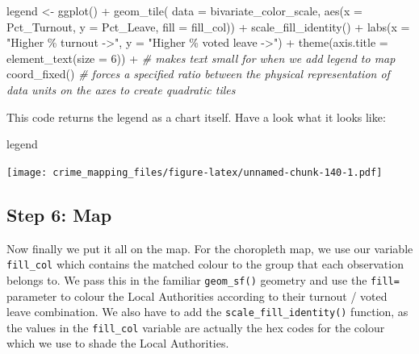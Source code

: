 \documentclass[
]{book}
\newenvironment{Shaded}{\begin{snugshade}}{\end{snugshade}}
\newcommand{\AttributeTok}[1]{\textcolor[rgb]{0.77,0.63,0.00}{#1}}
\newcommand{\CommentTok}[1]{\textcolor[rgb]{0.56,0.35,0.01}{\textit{#1}}}
\newcommand{\DecValTok}[1]{\textcolor[rgb]{0.00,0.00,0.81}{#1}}
\newcommand{\FunctionTok}[1]{\textcolor[rgb]{0.00,0.00,0.00}{#1}}
\newcommand{\NormalTok}[1]{#1}
\newcommand{\OtherTok}[1]{\textcolor[rgb]{0.56,0.35,0.01}{#1}}
\newcommand{\SpecialCharTok}[1]{\textcolor[rgb]{0.00,0.00,0.00}{#1}}
\newcommand{\StringTok}[1]{\textcolor[rgb]{0.31,0.60,0.02}{#1}}
\begin{document}
\begin{Shaded}
\begin{Highlighting}[]
\NormalTok{legend }\OtherTok{\textless{}{-}} \FunctionTok{ggplot}\NormalTok{() }\SpecialCharTok{+}
  \FunctionTok{geom\_tile}\NormalTok{( }\AttributeTok{data =}\NormalTok{ bivariate\_color\_scale, }\FunctionTok{aes}\NormalTok{(}\AttributeTok{x =}\NormalTok{ Pct\_Turnout, }\AttributeTok{y =}\NormalTok{ Pct\_Leave, }\AttributeTok{fill =}\NormalTok{ fill\_col)) }\SpecialCharTok{+}
  \FunctionTok{scale\_fill\_identity}\NormalTok{() }\SpecialCharTok{+}
  \FunctionTok{labs}\NormalTok{(}\AttributeTok{x =} \StringTok{"Higher \% turnout {-}\textgreater{}"}\NormalTok{,}
       \AttributeTok{y =} \StringTok{"Higher \% voted leave {-}\textgreater{}"}\NormalTok{) }\SpecialCharTok{+}
  \FunctionTok{theme}\NormalTok{(}\AttributeTok{axis.title =} \FunctionTok{element\_text}\NormalTok{(}\AttributeTok{size =} \DecValTok{6}\NormalTok{)) }\SpecialCharTok{+}   \CommentTok{\# makes text small for when we add legend to map}
  \FunctionTok{coord\_fixed}\NormalTok{()  }\CommentTok{\# forces a specified ratio between the physical representation of data units on the axes to create quadratic tiles}
\end{Highlighting}
\end{Shaded}

This code returns the legend as a chart itself. Have a look what it looks like:

\begin{Shaded}
\begin{Highlighting}[]
\NormalTok{legend}
\end{Highlighting}
\end{Shaded}

\texttt{[image: crime\_mapping\_files/figure-latex/unnamed-chunk-140-1.pdf]}

\hypertarget{step-6-map}{%
\subsection{Step 6: Map}\label{step-6-map}}

Now finally we put it all on the map. For the choropleth map, we use our variable \texttt{fill\_col} which contains the matched colour to the group that each observation belongs to. We pass this in the familiar \texttt{geom\_sf()} geometry and use the \texttt{fill=} parameter to colour the Local Authorities according to their turnout / voted leave combination. We also have to add the \texttt{scale\_fill\_identity()} function, as the values in the \texttt{fill\_col} variable are actually the hex codes for the colour which we use to shade the Local Authorities.
\end{document}
